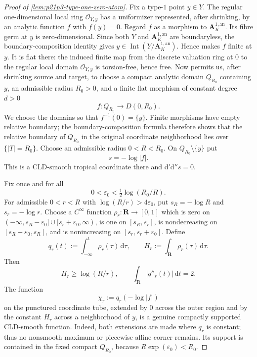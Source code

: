\begin{proof}[Proof of \cref{lem:p21p3-type-one-zero-atom}]
Fix a type-$1$ point $y\in Y$.  The regular one-dimensional local ring
\(\mathcal O_{Y,y}\) has a uniformizer represented, after shrinking, by
an analytic function \(f\) with \(f(y)=0\).  Regard \(f\) as a morphism to
\(\mathbf A^{1,\mathrm{an}}_K\).  Its fibre germ at \(y\) is
zero-dimensional.  Since both \(Y\) and \(\mathbf A^{1,\mathrm{an}}_K\)
are boundaryless, the boundary-composition identity
\cite[(11.4.1.3)]{CLD25} gives
\(y\in\operatorname{Int}(Y/\mathbf A^{1,\mathrm{an}}_K)\).  Hence
\cite[Lemma~11.6.5(a)]{CLD25} makes \(f\) finite at \(y\).  It is flat
there: the induced finite map from the discrete valuation ring at \(0\)
to the regular local domain \(\mathcal O_{Y,y}\) is torsion-free, hence
free.  Now \cite[\S11.6.3]{CLD25} permits us, after shrinking source and
target, to choose a compact analytic domain \(Q_{R_0}\) containing \(y\),
an admissible radius \(R_0>0\), and a finite flat morphism of constant
degree \(d>0\)
\[
             f:Q_{R_0}\longrightarrow D(0,R_0).
\]
We choose the domains so that \(f^{-1}(0)=\{y\}\).  Finite morphisms have
empty relative boundary; the boundary-composition formula
\cite[(11.4.1.3)]{CLD25} therefore shows that the relative boundary of
\(Q_{R_0}\) in the original coordinate neighborhood lies over
\(\{|T|=R_0\}\).  Choose an admissible radius \(0<R<R_0\).
On $Q_{R_0}\setminus\{y\}$ put
\[
                         s=-\log|f|.
\]
This is a CLD-smooth tropical coordinate there and
$\mathrm d'\mathrm d''s=0$.

Fix once and for all
\[
 0<\varepsilon_0<
 \tfrac12\log(R_0/R).
\]
For admissible $0<r<R$ with \(\log(R/r)>4\varepsilon_0\), put
$s_R=-\log R$ and $s_r=-\log r$.
Choose a $C^\infty$ function
\(\rho_r:\mathbf R\to[0,1]\) which is zero on
\((-\infty,s_R-\varepsilon_0]\cup[s_r+\varepsilon_0,\infty)\), is one
on \([s_R,s_r]\), is nondecreasing on
\([s_R-\varepsilon_0,s_R]\), and is nonincreasing on
\([s_r,s_r+\varepsilon_0]\).  Define
\[
 q_r(t):=\int_{-\infty}^{t}\rho_r(\tau)\,\mathrm d\tau,
 \qquad
 H_r:=\int_{\mathbf R}\rho_r(\tau)\,\mathrm d\tau .
\]
Then
\begin{equation}
\label{eq:p21p3-radial-tent-data}
 H_r\geq \log(R/r),
 \qquad
 \int_{\mathbf R}|q''_r(t)|\,\mathrm dt=2.
\end{equation}
The function
\[
 \chi_r:=q_r(-\log|f|)
\]
on the punctured coordinate tube, extended by $0$ across the outer region
and by the constant \(H_r\) across a neighborhood of
$y$, is a genuine compactly supported CLD-smooth function.  Indeed, both
extensions are made where \(q_r\) is constant; thus no
nonsmooth maximum or piecewise affine corner remains.
Its support is contained in the fixed compact \(Q_{R_0}\), because
\(R\exp(\varepsilon_0)<R_0\).


\end{proof}
